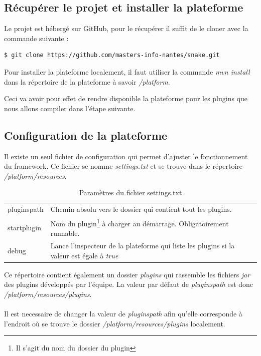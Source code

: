 \documentclass[12pt,a4paper]{article}
\begin{document}
\subsection{Récupérer le projet et installer la plateforme}
Le projet est hébergé sur GitHub, pour le récupérer il suffit de le cloner avec
la commande suivante :

\begin{lstlisting}[language=bash,caption=Télécharger le projet]
$ git clone https://github.com/masters-info-nantes/snake.git
\end{lstlisting}

Pour installer la plateforme localement, il faut utiliser la commande 
\og{}\emph{mvn install}\fg{} dans la répertoire de la plateforme à savoir 
\emph{/platform}.

Ceci va avoir pour effet de rendre disponible la plateforme pour les plugins 
que nous allons compiler dans l'étape suivante.

\subsection{Configuration de la plateforme}
Il existe un seul fichier de configuration qui permet d'ajuster le fonctionnement 
du framework. Ce fichier se nomme \emph{settings.txt} et se trouve dans le 
répertoire \emph{/platform/resources}.

\begin{table}[h]
\centering
	\begin{tabular}{lp{9cm}}
		pluginspath & Chemin absolu vers le dossier qui contient tout les plugins.\\
					 
		startplugin & Nom du plugin\footnote{Il s'agit du nom du dossier du 
		plugin} à charger au démarrage. Obligatoirement runnable.\\	
		
		debug & Lance l'inspecteur de la plateforme qui liste les plugins si la valeur 
		est égale à \emph{true}				 
	\end{tabular}	
\caption{Paramètres du fichier settings.txt}
\end{table}
	
Ce répertoire contient également un dossier \emph{plugins} qui rassemble les fichiers 
\emph{jar} des plugins développés par l'équipe. La valeur par défaut de 
\emph{pluginspath} est donc \emph{/platform/resources/plugins}.
\\\\
Il est necessaire de changer la valeur de \emph{pluginspath} afin qu'elle corresponde 
à l'endroit où se trouve le dossier \emph{/platform/resources/plugins} localement.
\end{document}
